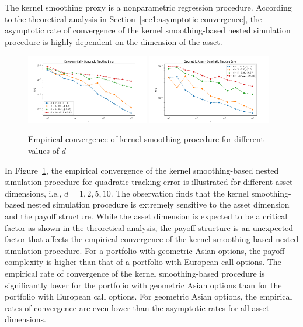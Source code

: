 The kernel smoothing proxy is a nonparametric regression procedure.
According to the theoretical analysis in Section~\ref{sec1:asymptotic-convergence}, the asymptotic rate of convergence of the kernel smoothing-based nested simulation procedure is highly dependent on the dimension of the asset.

\begin{figure}[ht!]
    \centering
    \includegraphics[width=0.48\textwidth]{./project1/figures/figure4a.png}
    \includegraphics[width=0.48\textwidth]{./project1/figures/figure4b.png}
    \caption{Empirical convergence of kernel smoothing procedure for different values of $d$}
    \label{fig1:kernel_d} 
\end{figure}

In Figure~\ref{fig1:kernel_d}, the empirical convergence of the kernel smoothing-based nested simulation procedure for quadratic tracking error is illustrated for different asset dimensions, i.e., $d = 1, 2, 5, 10$.
The observation finds that the kernel smoothing-based nested simulation procedure is extremely sensitive to the asset dimension and the payoff structure.
While the asset dimension is expected to be a critical factor as shown in the theoretical analysis, the payoff structure is an unexpected factor that affects the empirical convergence of the kernel smoothing-based nested simulation procedure.
For a portfolio with geometric Asian options, the payoff complexity is higher than that of a portfolio with European call options.
The empirical rate of convergence of the kernel smoothing-based procedure is significantly lower for the portfolio with geometric Asian options than for the portfolio with European call options.
For geometric Asian options, the empirical rates of convergence are even lower than the asymptotic rates for all asset dimensions.

